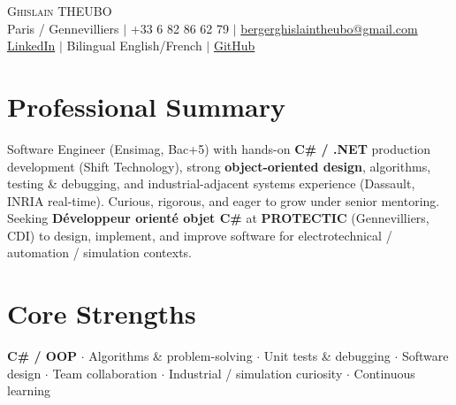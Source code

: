 \documentclass[letterpaper,10.5pt]{article}
\begin{document}
\begin{center}
{\Huge \scshape Ghislain THEUBO} \\ \vspace{2pt}
\small Paris / Gennevilliers $|$ +33 6 82 86 62 79 $|$ \href{mailto:bergerghislaintheubo@gmail.com}{bergerghislaintheubo@gmail.com} \\
\href{https://www.linkedin.com/in/berger-ghislain}{LinkedIn} $|$ Bilingual English/French $|$ \href{https://github.com/Bergerghislain}{GitHub}
\end{center}
\vspace{-6pt}
\section{Professional Summary}
\small{Software Engineer (Ensimag, Bac+5) with hands-on \textbf{C\# / .NET} production development (Shift Technology), strong \textbf{object-oriented design}, algorithms, testing \& debugging, and industrial-adjacent systems experience (Dassault, INRIA real-time). Curious, rigorous, and eager to grow under senior mentoring. Seeking \textbf{D\'eveloppeur orient\'e objet C\#} at \textbf{PROTECTIC} (Gennevilliers, CDI) to design, implement, and improve software for electrotechnical / automation / simulation contexts.}
\section{Core Strengths}
\small{\textbf{C\# / OOP} $\cdot$ Algorithms \& problem-solving $\cdot$ Unit tests \& debugging $\cdot$ Software design $\cdot$ Team collaboration $\cdot$ Industrial / simulation curiosity $\cdot$ Continuous learning}
\end{document}
